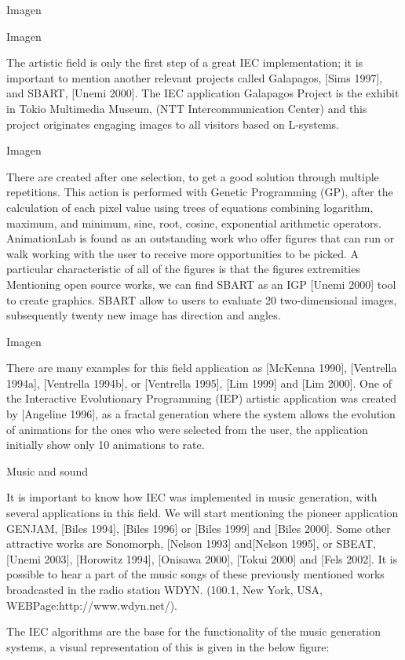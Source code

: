 Imagen

Imagen

The artistic field is only the first step of a great IEC implementation; it is
important to mention another relevant projects called Galapagos, [Sims 1997],
and SBART, [Unemi 2000]. The IEC application Galapagos Project is the exhibit in
Tokio Multimedia Museum, (NTT Intercommunication Center) and this project
originates engaging images to all visitors based on L-systems.

Imagen

There are created after one selection, to get a good solution through multiple
repetitions. This action is performed with Genetic Programming (GP), after the
calculation of each pixel value using trees of equations combining logarithm,
maximum, and minimum, sine, root, cosine, exponential arithmetic operators.
AnimationLab is found as an outstanding work who offer figures that can run or
walk working with the user to receive more opportunities to be picked. A
particular characteristic of all of the figures is that the figures extremities
Mentioning open source works, we can find SBART as an IGP [Unemi 2000] tool to
create graphics. SBART allow to users to evaluate 20 two-dimensional images,
subsequently twenty new image has direction and angles.

Imagen

There are many examples for this field application as [McKenna 1990], [Ventrella
1994a], [Ventrella 1994b], or [Ventrella 1995], [Lim 1999] and [Lim 2000].  One
of the Interactive Evolutionary Programming (IEP)  artistic application was
created by [Angeline 1996], as a fractal generation where the system allows the
evolution of animations for the ones who were selected from the user, the
application initially show only 10 animations to rate.

Music and sound

It is important to know how IEC was implemented in music generation, with
several applications in this field. We will start mentioning the pioneer
application GENJAM, [Biles 1994], [Biles 1996] or [Biles 1999] and [Biles 2000].
Some other attractive works are Sonomorph, [Nelson 1993] and[Nelson 1995], or
SBEAT, [Unemi 2003], [Horowitz 1994], [Onisawa 2000], [Tokui 2000] and [Fels
2002]. It is possible to hear a part of the music songs of these previously
mentioned works broadcasted in the radio station WDYN. (100.1, New York, USA,
WEBPage:http://www.wdyn.net/).

The IEC algorithms are the base for the functionality of the music generation
systems, a visual representation of this is given in the below figure:

